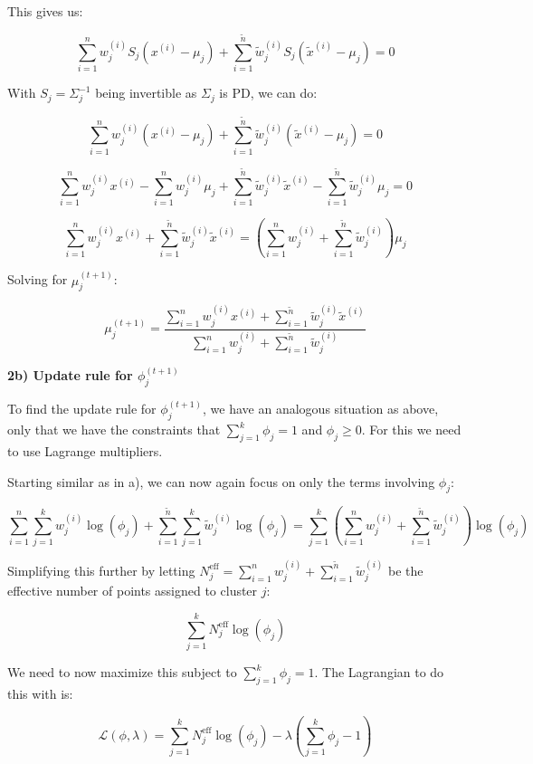 \begin{answer}
    This gives us:

    $$\sum_{i=1}^{n} w_j^{(i)} S_j (x^{(i)} - \mu_j) + \sum_{i=1}^{\tilde{n}} \tilde{w}_j^{(i)} S_j (\tilde{x}^{(i)} - \mu_j) = 0$$

    With $S_j = \Sigma_j^{-1}$ being invertible as $\Sigma_j$ is PD, we can do:

    $$\sum_{i=1}^{n} w_j^{(i)} (x^{(i)} - \mu_j) + \sum_{i=1}^{\tilde{n}} \tilde{w}_j^{(i)} (\tilde{x}^{(i)} - \mu_j) = 0$$

    $$\sum_{i=1}^{n} w_j^{(i)} x^{(i)} - \sum_{i=1}^{n} w_j^{(i)} \mu_j + \sum_{i=1}^{\tilde{n}} \tilde{w}_j^{(i)} \tilde{x}^{(i)} - \sum_{i=1}^{\tilde{n}} \tilde{w}_j^{(i)} \mu_j = 0$$

    $$\sum_{i=1}^{n} w_j^{(i)} x^{(i)} + \sum_{i=1}^{\tilde{n}} \tilde{w}_j^{(i)} \tilde{x}^{(i)} = \left( \sum_{i=1}^{n} w_j^{(i)} + \sum_{i=1}^{\tilde{n}} \tilde{w}_j^{(i)} \right) \mu_j$$

    Solving for $\mu_j^{(t+1)}$:

    $$\mu_j^{(t+1)} = \frac{\sum_{i=1}^{n} w_j^{(i)} x^{(i)} + \sum_{i=1}^{\tilde{n}} \tilde{w}_j^{(i)} \tilde{x}^{(i)}}{\sum_{i=1}^{n} w_j^{(i)} + \sum_{i=1}^{\tilde{n}} \tilde{w}_j^{(i)}}$$

    \textbf{2b) Update rule for $\phi_j^{(t+1)}$}

    To find the update rule for $\phi_j^{(t+1)}$, we have an analogous situation as above, only that we have the constraints that $\sum_{j=1}^{k} \phi_j = 1$ and $\phi_j \ge 0$. For this we need to use Lagrange multipliers.

    Starting similar as in a), we can now again focus on only the terms involving $\phi_j$:

    $$\sum_{i=1}^{n} \sum_{j=1}^{k} w_j^{(i)} \log(\phi_j) + \sum_{i=1}^{\tilde{n}} \sum_{j=1}^{k} \tilde{w}_j^{(i)} \log(\phi_j) = \sum_{j=1}^{k} \left( \sum_{i=1}^{n} w_j^{(i)} + \sum_{i=1}^{\tilde{n}} \tilde{w}_j^{(i)} \right) \log(\phi_j)$$

    Simplifying this further by letting $N_j^{\text{eff}} = \sum_{i=1}^{n} w_j^{(i)} + \sum_{i=1}^{\tilde{n}} \tilde{w}_j^{(i)}$ be the effective number of points assigned to cluster $j$:

    $$\sum_{j=1}^{k} N_j^{\text{eff}} \log(\phi_j)$$

    We need to now maximize this subject to $\sum_{j=1}^{k} \phi_j = 1$. The Lagrangian to do this with is:

    $$\mathcal{L}(\phi, \lambda) = \sum_{j=1}^{k} N_j^{\text{eff}} \log(\phi_j) - \lambda \left( \sum_{j=1}^{k} \phi_j - 1 \right)$$


\end{answer}

